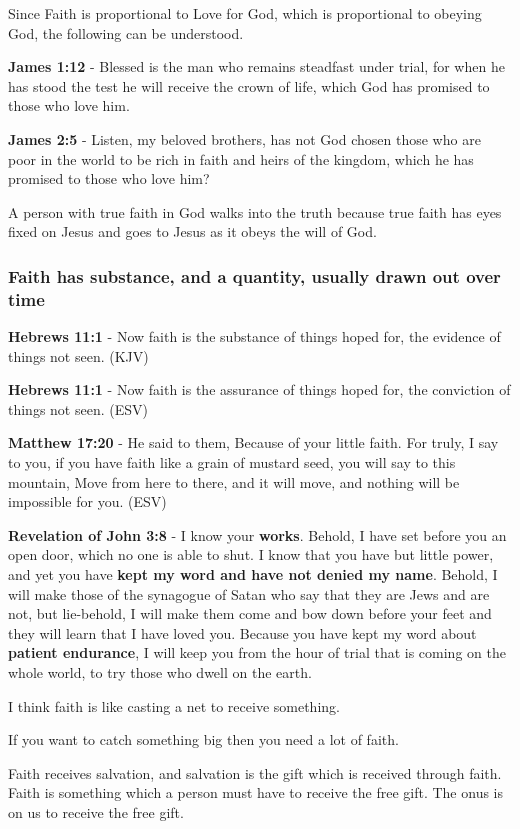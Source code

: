 \documentclass[11pt]{article}
\begin{document}
Since Faith is proportional to Love for God, which is proportional to obeying God, the following can be understood.

\textbf{James 1:12} - Blessed is the man who remains steadfast under trial, for when he has stood the test he will receive the crown of life, which God has promised to those who love him.

\textbf{James 2:5} - Listen, my beloved brothers, has not God chosen those who are poor in the world to be rich in faith and heirs of the kingdom, which he has promised to those who love him?

A person with true faith in God walks into the truth because true faith has eyes fixed on Jesus and goes to Jesus as it obeys the will of God.

\subsubsection{Faith has substance, and a quantity, usually drawn out over time}
\label{sec:orgd14915b}
\textbf{Hebrews 11:1} - Now faith is the substance of things hoped for, the evidence of things not seen. (KJV)

\textbf{Hebrews 11:1} - Now faith is the assurance of things hoped for, the conviction of things not seen. (ESV)

\textbf{Matthew 17:20} - He said to them, Because of your little faith. For truly, I say to you, if you have faith like a grain of mustard seed, you will say to this mountain, Move from here to there, and it will move, and nothing will be impossible for you. (ESV)

\textbf{Revelation of John 3:8} - I know your \textbf{works}. Behold, I have set before you an open door, which no one is able to shut. I know that you have but little power, and yet you have \textbf{kept my word and have not denied my name}. Behold, I will make those of the synagogue of Satan who say that they are Jews and are not, but lie-behold, I will make them come and bow down before your feet and they will learn that I have loved you. Because you have kept my word about \textbf{patient endurance}, I will keep you from the hour of trial that is coming on the whole world, to try those who dwell on the earth.

I think faith is like casting a net to receive something.

If you want to catch something big then you need a lot of faith.

Faith receives salvation, and salvation is the gift which is received through faith.
Faith is something which a person must have to receive the free gift.
The onus is on us to receive the free gift.
\end{document}
